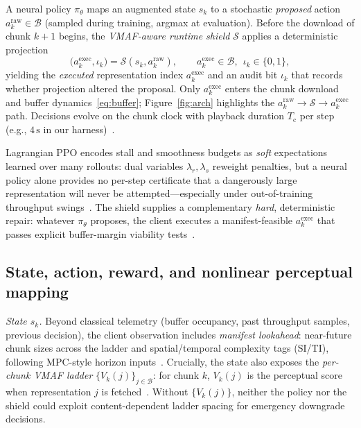 \documentclass[preprint,12pt,times]{elsarticle}
\begin{document}
A neural policy \(\pi_\theta\) maps an augmented state \(s_k\) to a stochastic \emph{proposed} action \(a^{\mathrm{raw}}_k\in\mathcal{B}\) (sampled during training, argmax at evaluation).
Before the download of chunk \(k{+}1\) begins, the \emph{VMAF-aware runtime shield} \(\mathcal{S}\) applies a deterministic projection
\begin{equation}
\label{eq:shield-map}
    \big(a^{\mathrm{exec}}_k,\iota_k\big)=\mathcal{S}\!\left(s_k,a^{\mathrm{raw}}_k\right),\qquad a^{\mathrm{exec}}_k\in\mathcal{B},\ \ \iota_k\in\{0,1\},
\end{equation}
yielding the \emph{executed} representation index \(a^{\mathrm{exec}}_k\) and an audit bit \(\iota_k\) that records whether projection altered the proposal.
Only \(a^{\mathrm{exec}}_k\) enters the chunk download and buffer dynamics~\eqref{eq:buffer}; Figure~\ref{fig:arch} highlights the \(a^{\mathrm{raw}}_k\!\rightarrow\!\mathcal{S}\!\rightarrow\!a^{\mathrm{exec}}_k\) path.
Decisions evolve on the chunk clock with playback duration \(T_{\mathrm{c}}\) per step (e.g., \(4\,\mathrm{s}\) in our harness)~\cite{mao2017neural,yin2015control}.

Lagrangian PPO encodes stall and smoothness budgets as \emph{soft} expectations learned over many rollouts: dual variables \(\lambda_r,\lambda_s\) reweight penalties, but a neural policy alone provides no per-step certificate that a dangerously large representation will never be attempted---especially under out-of-training throughput swings~\cite{paternain2019dual,achiam2017constrained,meng2024mmwave}.
The shield supplies a complementary \emph{hard}, deterministic repair: whatever \(\pi_\theta\) proposes, the client executes a manifest-feasible \(a^{\mathrm{exec}}_k\) that passes explicit buffer-margin viability tests~\cite{alshiekh2018shielding}.

\subsection{State, action, reward, and nonlinear perceptual mapping}

\emph{State \(s_k\).}
Beyond classical telemetry (buffer occupancy, past throughput samples, previous decision), the client observation includes \emph{manifest lookahead}: near-future chunk sizes across the ladder and spatial/temporal complexity tags (SI/TI), following MPC-style horizon inputs~\cite{yin2015control,sodagar2011mpeg,mao2017neural}.
Crucially, the state also exposes the \emph{per-chunk VMAF ladder} \(\{V_k(j)\}_{j\in\mathcal{B}}\): for chunk \(k\), \(V_k(j)\) is the perceptual score when representation \(j\) is fetched~\cite{li2016vmaf}.
Without \(\{V_k(j)\}\), neither the policy nor the shield could exploit content-dependent ladder spacing for emergency downgrade decisions.
\end{document}
